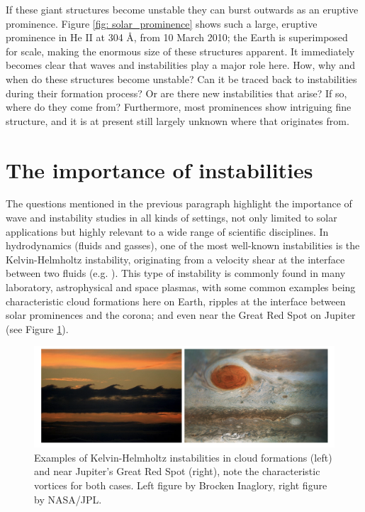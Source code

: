 If these giant structures become unstable they can burst outwards as an eruptive prominence. Figure \ref{fig: solar_prominence} shows such a large, eruptive prominence in He II at 304 \AA, from 10 March 2010; the Earth is superimposed for scale, making the enormous size of these structures apparent. It immediately becomes clear that waves and instabilities play a major role here. How, why and when do these structures become unstable? Can it be traced back to instabilities during their formation process? Or are there new instabilities that arise? If so, where do they come from? Furthermore, most prominences show intriguing fine structure, and it is at present still largely unknown where that originates from.

\section{The importance of instabilities}
The questions mentioned in the previous paragraph highlight the importance of wave and instability studies in all kinds of settings, not only limited to solar applications but highly relevant to a wide range of scientific disciplines. In hydrodynamics (fluids and gasses), one of the most well-known instabilities is the Kelvin-Helmholtz instability, originating from a velocity shear at the interface between two fluids (e.g. \citep{book_choudhuri}). This type of instability is commonly found in many laboratory, astrophysical and space plasmas, with some common examples being characteristic cloud formations here on Earth, ripples at the interface between solar prominences and the corona; and even near the Great Red Spot on Jupiter (see Figure \ref{fig: kh_instability}).

\begin{figure}[b]
  \centering
  \includegraphics[width=\textwidth]{instabilities.png}
  \caption{
    Examples of Kelvin-Helmholtz instabilities in cloud formations (left) and near Jupiter's Great Red Spot (right), note the characteristic vortices for both cases. Left figure by Brocken Inaglory, right figure by NASA/JPL.
  }
  \label{fig: kh_instability}
\end{figure}

